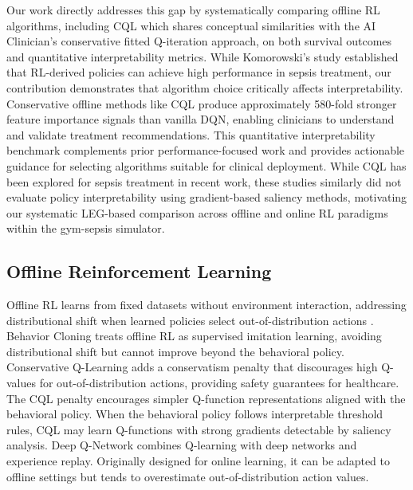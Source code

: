Our work directly addresses this gap by systematically comparing offline RL algorithms, including CQL which shares conceptual similarities with the AI Clinician's conservative fitted Q-iteration approach, on both survival outcomes and quantitative interpretability metrics. While Komorowski's study established that RL-derived policies can achieve high performance in sepsis treatment, our contribution demonstrates that algorithm choice critically affects interpretability. Conservative offline methods like CQL produce approximately 580-fold stronger feature importance signals than vanilla DQN, enabling clinicians to understand and validate treatment recommendations. This quantitative interpretability benchmark complements prior performance-focused work and provides actionable guidance for selecting algorithms suitable for clinical deployment. While CQL has been explored for sepsis treatment in recent work, these studies similarly did not evaluate policy interpretability using gradient-based saliency methods, motivating our systematic LEG-based comparison across offline and online RL paradigms within the gym-sepsis simulator.


\subsection{Offline Reinforcement Learning}\label{sec:related:offline}

Offline RL learns from fixed datasets without environment interaction, addressing distributional shift when learned policies select out-of-distribution actions \citep{levine2020offline}. Behavior Cloning \citep{pomerleau1991bc} treats offline RL as supervised imitation learning, avoiding distributional shift but cannot improve beyond the behavioral policy. Conservative Q-Learning \citep{kumar2020cql} adds a conservatism penalty that discourages high Q-values for out-of-distribution actions, providing safety guarantees for healthcare. The CQL penalty encourages simpler Q-function representations aligned with the behavioral policy. When the behavioral policy follows interpretable threshold rules, CQL may learn Q-functions with strong gradients detectable by saliency analysis. Deep Q-Network \citep{mnih2015dqn} combines Q-learning with deep networks and experience replay. Originally designed for online learning, it can be adapted to offline settings but tends to overestimate out-of-distribution action values.


